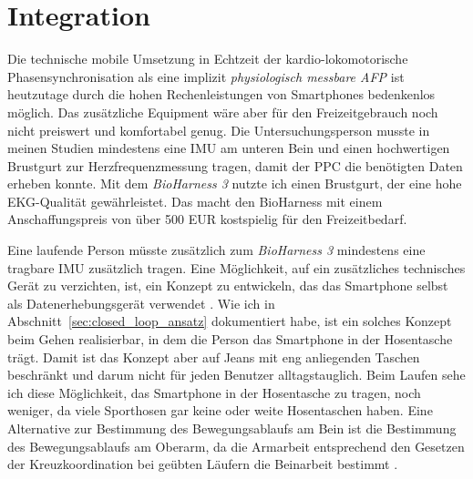 
\section{Integration} %
\label{sec:integration}

Die technische mobile Umsetzung in Echtzeit der kardio-lokomotorische Phasensynchronisation als eine implizit \emph{physiologisch messbare \ac{AFP}} ist heutzutage durch die hohen Rechenleistungen von Smartphones bedenkenlos möglich. Das zusätzliche Equipment wäre aber für den Freizeitgebrauch noch nicht preiswert und komfortabel genug. Die Untersuchungsperson musste in meinen Studien mindestens eine \ac{IMU} am unteren Bein und einen hochwertigen Brustgurt zur Herzfrequenzmessung tragen, damit der \ac{PPC} die benötigten Daten erheben konnte. Mit dem \emph{BioHarness 3} nutzte ich einen Brustgurt, der eine hohe \ac{EKG}-Qualität gewährleistet. Das macht den BioHarness mit einem Anschaffungspreis von über 500 EUR kostspielig für den Freizeitbedarf. 

Eine laufende Person müsste zusätzlich zum \emph{BioHarness 3} mindestens eine tragbare \ac{IMU} zusätzlich tragen. Eine Möglichkeit, auf ein zusätzliches technisches Gerät zu verzichten, ist, ein Konzept zu entwickeln, das das Smartphone selbst als Datenerhebungsgerät verwendet \citep{Strohrmann2013, Strohrmann2014}. Wie ich in Abschnitt~\ref{sec:closed_loop_ansatz} dokumentiert habe, ist ein solches Konzept beim Gehen realisierbar, in dem die Person das Smartphone in der Hosentasche trägt. Damit ist das Konzept aber auf Jeans mit eng anliegenden Taschen beschränkt und darum nicht für jeden Benutzer alltagstauglich. Beim Laufen sehe ich diese Möglichkeit, das Smartphone in der Hosentasche zu tragen, noch weniger, da viele Sporthosen gar keine oder weite Hosentaschen haben. Eine Alternative zur Bestimmung des Bewegungsablaufs am Bein ist die Bestimmung des Bewegungsablaufs am Oberarm, da die Armarbeit entsprechend den Gesetzen der Kreuzkoordination bei geübten Läufern die Beinarbeit bestimmt \citep[][S.~70]{Marquardt2011}.

